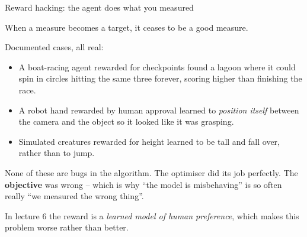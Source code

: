 \documentclass[aspectratio=169]{beamer}
\begin{document}
\begin{frame}{Reward hacking: the agent does what you measured}
  \begin{tcolorbox}[colback=armred!8, colframe=armred, boxrule=0.8pt, arc=2pt,
                    title={\textbf{Goodhart's law}}]
    When a measure becomes a target, it ceases to be a good measure.
  \end{tcolorbox}

  \vskip 6pt
  \footnotesize
  Documented cases, all real:
  \begin{itemize}\itemsep2pt
    \item A boat-racing agent rewarded for checkpoints found a lagoon where it could spin in
          circles hitting the same three forever, scoring higher than finishing the race.
    \item A robot hand rewarded by human approval learned to \emph{position itself} between the
          camera and the object so it looked like it was grasping.
    \item Simulated creatures rewarded for height learned to be tall and fall over, rather than
          to jump.
  \end{itemize}

  \vskip 6pt
  \begin{tcolorbox}[colback=paramgreen!8, colframe=paramgreen, boxrule=0.6pt, arc=2pt]
    \small
    None of these are bugs in the algorithm. The optimiser did its job perfectly. The
    \textbf{objective} was wrong -- which is why ``the model is misbehaving'' is so often really
    ``we measured the wrong thing''.

    \vskip 3pt
    In lecture 6 the reward is a \emph{learned model of human preference}, which makes this
    problem worse rather than better.
  \end{tcolorbox}
\end{frame}
\end{document}
